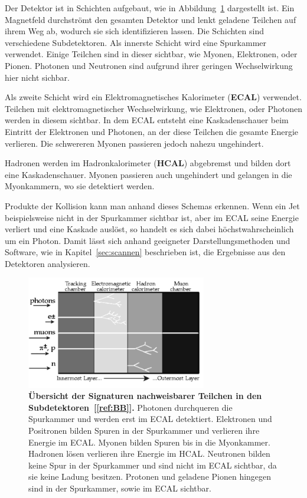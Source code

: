 \documentclass[a4paper,ngerman]{scrartcl}
\begin{document}
Der Detektor ist in Schichten aufgebaut, wie in Abbildung~\ref{fig:delphi_schichten} dargestellt ist.
Ein Magnetfeld durchströmt den gesamten Detektor und lenkt geladene Teilchen auf ihrem Weg ab, wodurch sie sich identifizieren lassen.
Die Schichten sind verschiedene Subdetektoren. 
Als innerste Schicht wird eine Spurkammer verwendet.
Einige Teilchen sind in dieser sichtbar, wie Myonen, Elektronen, oder Pionen.
Photonen und Neutronen sind aufgrund ihrer geringen Wechselwirkung hier nicht sichbar.

Als zweite Schicht wird ein Elektromagnetisches Kalorimeter (\textbf{ECAL}) verwendet.
Teilchen mit elektromagnetischer Wechselwirkung, wie Elektronen, oder Photonen werden in diesem sichtbar.
In dem ECAL entsteht eine Kaskadenschauer beim Eintritt der Elektronen und Photonen, an der diese Teilchen die gesamte Energie verlieren. 
Die schwereren Myonen passieren jedoch nahezu ungehindert.

Hadronen werden im Hadronkalorimeter (\textbf{HCAL}) abgebremst und bilden dort eine Kaskadenschauer.
Myonen passieren auch ungehindert und gelangen in die Myonkammern, wo sie detektiert werden.

Produkte der Kollision kann man anhand dieses Schemas erkennen. 
Wenn ein Jet beispielsweise nicht in der Spurkammer sichtbar ist, aber im ECAL seine Energie verliert und eine Kaskade auslöst,
so handelt es sich dabei höchstwahrscheinlich um ein Photon.
Damit lässt sich anhand geeigneter Darstellungsmethoden und Software, wie in Kapitel~\ref{sec:scannen} beschrieben ist, die Ergebnisse aus den Detektoren analysieren.

\begin{figure}[tbh!]
\centering
\includegraphics[width=0.7\textwidth]{abbildungen/delphi_schichten.png}
\caption{\textbf{Übersicht der Signaturen nachweisbarer Teilchen in den Subdetektoren~[\ref{ref:BB}].} 
Photonen durchqueren die Spurkammer und werden erst im ECAL detektiert.
Elektronen und Positronen bilden Spuren in der Spurkammer und verlieren ihre Energie im ECAL.
Myonen bilden Spuren bis in die Myonkammer.
Hadronen lösen verlieren ihre Energie im HCAL.
Neutronen bilden keine Spur in der Spurkammer und sind nicht im ECAL sichtbar, da sie keine Ladung besitzen.
Protonen und geladene Pionen hingegen sind in der Spurkammer, sowie im ECAL sichtbar.
}
\label{fig:delphi_schichten}
\end{figure}
\end{document}
